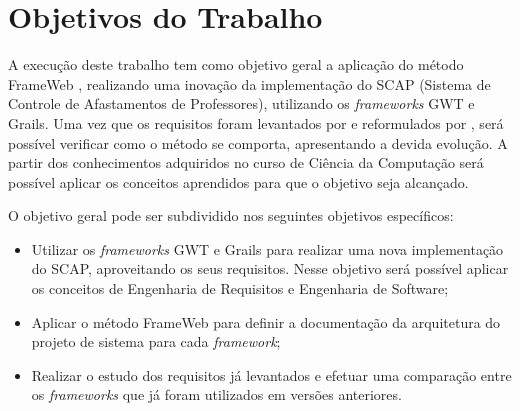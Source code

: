 
\section{Objetivos do Trabalho}
\label{sec-objetivos}


A execução deste trabalho tem como objetivo geral a aplicação do método FrameWeb \cite{souza:masterthesis07}, realizando uma inovação da implementação do SCAP (Sistema de Controle de Afastamentos de Professores), utilizando os \textit{frameworks} GWT e Grails. Uma vez que os requisitos foram levantados por  e reformulados por , será possível verificar como o método se comporta, apresentando a devida evolução. A partir dos conhecimentos adquiridos no curso de Ciência da Computação será possível aplicar os conceitos aprendidos para que o objetivo seja alcançado.

O objetivo geral pode ser subdividido nos seguintes objetivos específicos:

\begin{itemize}

	\item Utilizar os \textit{frameworks} GWT e Grails para realizar uma nova implementação do SCAP, aproveitando os seus requisitos. Nesse objetivo será possível aplicar os conceitos de Engenharia de Requisitos e Engenharia de Software;
	\item Aplicar o método FrameWeb para definir a documentação da arquitetura do projeto de sistema para cada \textit{framework};
    \item Realizar o estudo dos requisitos já levantados e efetuar uma comparação entre os \textit{frameworks} que já foram utilizados em versões anteriores.

\end{itemize}
